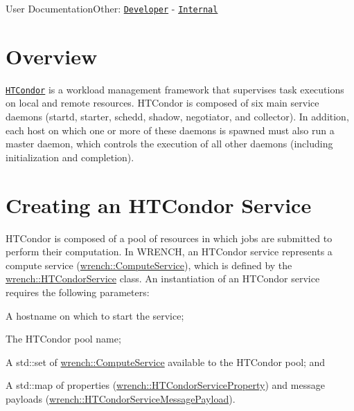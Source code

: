 User DocumentationOther\+: \href{../developer/guide-htcondor.html}{\tt Developer} -\/ \href{../internal/guide-htcondor.html}{\tt Internal}\hypertarget{guide-htcondor_guide-htcondor-overview}{}\section{Overview}\label{guide-htcondor_guide-htcondor-overview}
\href{http://htcondor.org}{\tt H\+T\+Condor} is a workload management framework that supervises task executions on local and remote resources. H\+T\+Condor is composed of six main service daemons ({\ttfamily startd}, {\ttfamily starter}, {\ttfamily schedd}, {\ttfamily shadow}, {\ttfamily negotiator}, and {\ttfamily collector}). In addition, each host on which one or more of these daemons is spawned must also run a {\ttfamily master} daemon, which controls the execution of all other daemons (including initialization and completion).\hypertarget{guide-htcondor_guide-htcondor-creating}{}\section{Creating an H\+T\+Condor Service}\label{guide-htcondor_guide-htcondor-creating}
H\+T\+Condor is composed of a pool of resources in which jobs are submitted to perform their computation. In W\+R\+E\+N\+CH, an H\+T\+Condor service represents a compute service ({\ttfamily \hyperlink{classwrench_1_1_compute_service}{wrench\+::\+Compute\+Service}}), which is defined by the {\ttfamily \hyperlink{classwrench_1_1_h_t_condor_service}{wrench\+::\+H\+T\+Condor\+Service}} class. An instantiation of an H\+T\+Condor service requires the following parameters\+:


\begin{DoxyItemize}
\item A hostname on which to start the service;
\item The H\+T\+Condor pool name;
\item A {\ttfamily std\+::set} of {\ttfamily \hyperlink{classwrench_1_1_compute_service}{wrench\+::\+Compute\+Service}} available to the H\+T\+Condor pool; and
\item A {\ttfamily std\+::map} of properties ({\ttfamily \hyperlink{classwrench_1_1_h_t_condor_service_property}{wrench\+::\+H\+T\+Condor\+Service\+Property}}) and message payloads ({\ttfamily \hyperlink{classwrench_1_1_h_t_condor_service_message_payload}{wrench\+::\+H\+T\+Condor\+Service\+Message\+Payload}}).
\end{DoxyItemize}

